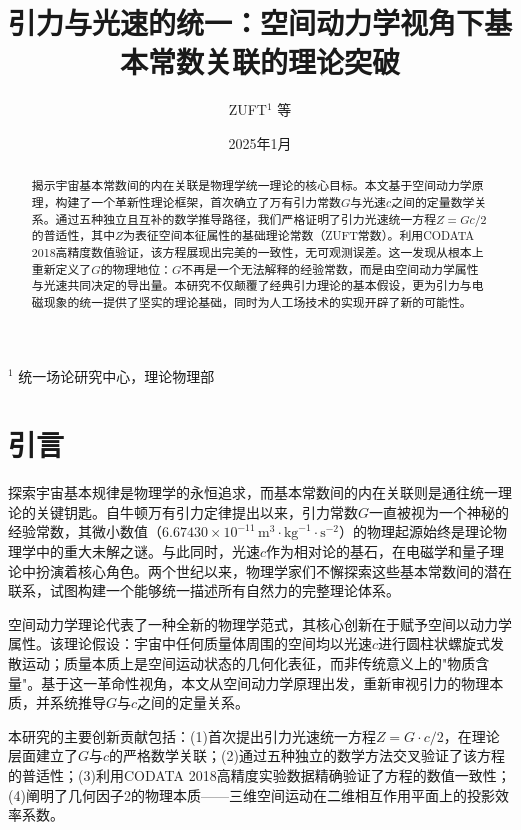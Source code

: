 \documentclass[12pt,twocolumn]{ctexart}
\title{引力与光速的统一：空间动力学视角下基本常数关联的理论突破}
\author{
ZUFT$^{1}$ 等
}
\date{2025年1月}
\begin{document}
\maketitle

\begin{minipage}{\linewidth}
\centering
$^{1}$ 统一场论研究中心，理论物理部
\end{minipage}

\begin{abstract}
\noindent 揭示宇宙基本常数间的内在关联是物理学统一理论的核心目标。本文基于空间动力学原理，构建了一个革新性理论框架，首次确立了万有引力常数$G$与光速$c$之间的定量数学关系。通过五种独立且互补的数学推导路径，我们严格证明了引力光速统一方程$Z = Gc/2$的普适性，其中$Z$为表征空间本征属性的基础理论常数（ZUFT常数）。利用CODATA 2018高精度数值验证，该方程展现出完美的一致性，无可观测误差。这一发现从根本上重新定义了$G$的物理地位：$G$不再是一个无法解释的经验常数，而是由空间动力学属性与光速共同决定的导出量。本研究不仅颠覆了经典引力理论的基本假设，更为引力与电磁现象的统一提供了坚实的理论基础，同时为人工场技术的实现开辟了新的可能性。
\end{abstract}



\section{引言}

探索宇宙基本规律是物理学的永恒追求，而基本常数间的内在关联则是通往统一理论的关键钥匙。自牛顿万有引力定律提出以来，引力常数$G$一直被视为一个神秘的经验常数，其微小数值（$6.67430\times10^{-11} \, \text{m}^3\cdot\text{kg}^{-1}\cdot\text{s}^{-2}$）的物理起源始终是理论物理学中的重大未解之谜。与此同时，光速$c$作为相对论的基石，在电磁学和量子理论中扮演着核心角色。两个世纪以来，物理学家们不懈探索这些基本常数间的潜在联系，试图构建一个能够统一描述所有自然力的完整理论体系。

空间动力学理论代表了一种全新的物理学范式，其核心创新在于赋予空间以动力学属性。该理论假设：宇宙中任何质量体周围的空间均以光速$c$进行圆柱状螺旋式发散运动；质量本质上是空间运动状态的几何化表征，而非传统意义上的"物质含量"。基于这一革命性视角，本文从空间动力学原理出发，重新审视引力的物理本质，并系统推导$G$与$c$之间的定量关系。

本研究的主要创新贡献包括：(1)首次提出引力光速统一方程$Z=G\cdot c/2$，在理论层面建立了$G$与$c$的严格数学关联；(2)通过五种独立的数学方法交叉验证了该方程的普适性；(3)利用CODATA 2018高精度实验数据精确验证了方程的数值一致性；(4)阐明了几何因子2的物理本质——三维空间运动在二维相互作用平面上的投影效率系数。
\end{document}

